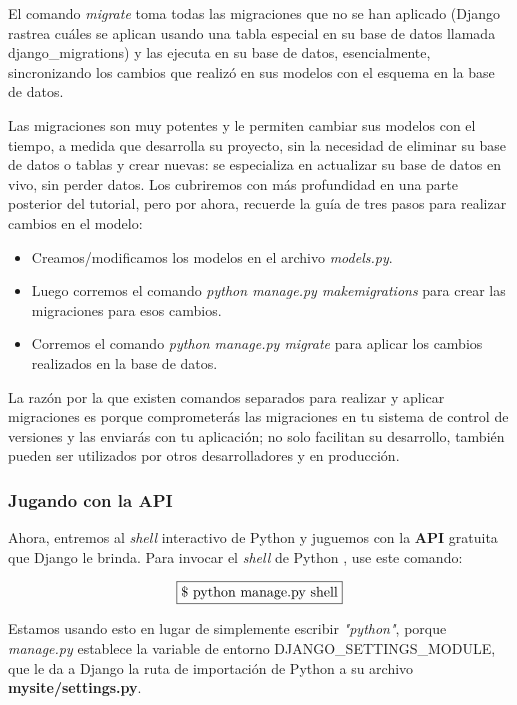 \documentclass[10pt]{article}
\newcommand{\py}[1]{{\textcolor{B}{Python} #1}}
\newcommand{\django}[1]{{\textcolor{G}{Django} #1}}
\begin{document}
El comando \textit{migrate} toma todas las migraciones que no se han aplicado (\django{} rastrea cuáles se aplican usando una tabla especial en su base de datos llamada \textcolor{G}{django\_migrations}) y las ejecuta en su base de datos, esencialmente, sincronizando los cambios que realizó en sus modelos con el esquema en la base de datos.

Las migraciones son muy potentes y le permiten cambiar sus modelos con el tiempo, a medida que desarrolla su proyecto, sin la necesidad de eliminar su base de datos o tablas y crear nuevas: se especializa en actualizar su base de datos en vivo, sin perder datos. Los cubriremos con más profundidad en una parte posterior del tutorial, pero por ahora, recuerde la guía de tres pasos para realizar cambios en el modelo:

\begin{itemize}
\item
Creamos/modificamos los modelos en el archivo \textit{models.py}.

\item
Luego corremos el comando \textit{python manage.py makemigrations} para crear las migraciones para esos cambios.

\item
Corremos el comando \textit{python manage.py migrate} para aplicar los cambios realizados en la base de datos.
\end{itemize}

La razón por la que existen comandos separados para realizar y aplicar migraciones es porque comprometerás las migraciones en tu sistema de control de versiones y las enviarás con tu aplicación; no solo facilitan su desarrollo, también pueden ser utilizados por otros desarrolladores y en producción.

\subsubsection{Jugando con la API}

Ahora, entremos al \textit{shell} interactivo de \py{} y juguemos con la \textbf{API} gratuita que \django{} le brinda. Para invocar el \textit{shell} de \py{}, use este comando:

$$\fbox{\$ python manage.py shell}$$


Estamos usando esto en lugar de simplemente escribir \textit{"python"}, porque \textit{manage.py} establece la variable de entorno \textcolor{G}{DJANGO\_SETTINGS\_MODULE}, que le da a \django{} la ruta de importación de \py{} a su archivo \textbf{mysite/settings.py}.
\end{document}
